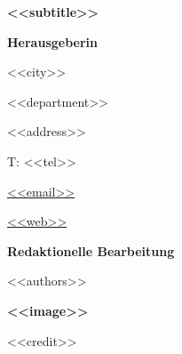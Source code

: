 \thispagestyle{empty}
 \vspace*{<<space>>}
  \begin{minipage}[b][.25\textheight]{.5\textwidth}
  \begin{flushleft}
  \begingroup\fontsize{10}{12}\selectfont
    \vfill
    \textbf{<<subtitle>>} \par
    \vspace*{0.5cm}
    \textbf{Herausgeberin} \par
      {<<city>>} \par
      {<<department>>} \par
      {<<address>>} \par
      {T: <<tel>>} \par
      {\color{text_color_blue}\href{mailto:<<email>>}{<<email>>}} \par
      {\color{text_color_blue}\href{<<link_full>>}{<<web>>}} \par
    \vspace*{0.8cm}{<<date>>} \par
    \vspace*{1.8cm}
    \vspace*{\fill}\textbf{Redaktionelle Bearbeitung} \par
      <<authors>> \par
    \vspace*{<<space_credit>>}
    \vspace*{\fill}\textbf{<<image>>} \par
      {<<credit>>} \par
  \endgroup{}
  \end{flushleft}
  \end{minipage}
  \clearpage
  
